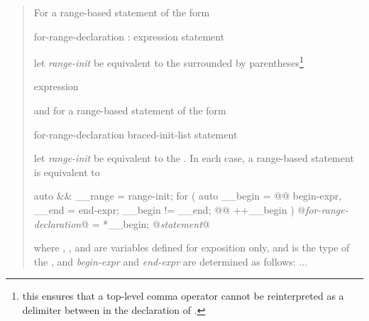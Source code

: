 \begin{quote}
\pnum
For a range-based  statement of the form

\begin{ncbnf}
    \terminal{(} for-range-declaration : expression \terminal{)} statement
\end{ncbnf}

let \textit{range-init} be equivalent to the  surrounded
by parentheses\footnote{this ensures that a top-level comma operator cannot be
  reinterpreted as a delimiter between  in the
  declaration of .}

\begin{ncbnf}
  \terminal{(} expression \terminal{)}
\end{ncbnf}

and for a range-based  statement of the form

\begin{ncbnf}
    \terminal{(} for-range-declaration \terminal{:} braced-init-list \terminal{)} statement
\end{ncbnf}

let \textit{range-init} be equivalent to the . In each case, a
range-based  statement
is equivalent to

\begin{codeblock}
  {
    auto && __range = range-init;
    for ( auto __begin =  @@ begin-expr,
    __end = end-expr;
    __begin != __end;
     @@ ++__begin ) {
      @\textit{for-range-declaration}@ = *__begin;
      @\textit{statement}@
    }
  }
\end{codeblock}

where 
\linebreak
{}, , and  are variables defined for
exposition only, and  is the type of the
, and \textit{begin-expr} and \textit{end-expr} are
determined as follows: ...


\end{quote}

